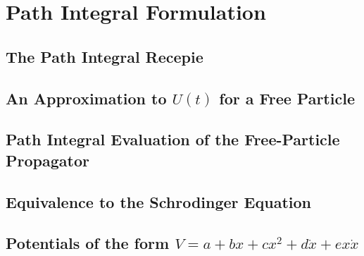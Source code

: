 \chapter{Path Integral Formulation}
\section{The Path Integral Recepie}
\section{An Approximation to $U(t)$ for a Free Particle}
\section{Path Integral Evaluation of the Free-Particle Propagator}
\section{Equivalence to the Schrodinger Equation}
\section{Potentials of the form $V = a + bx + cx^{2} + d \dot{x} + ex \dot{x}$}
